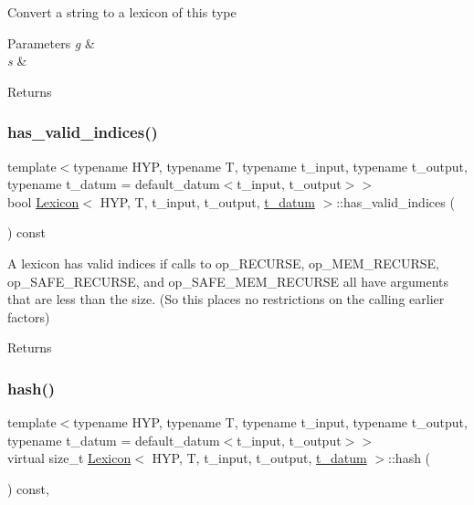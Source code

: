 Convert a string to a lexicon of this type 
\begin{DoxyParams}{Parameters}
{\em g} & \\
\hline
{\em s} & \\
\hline
\end{DoxyParams}
\begin{DoxyReturn}{Returns}

\end{DoxyReturn}
\mbox{\label{class_lexicon_a6d6b1b025ca707815a6776c3898503e4}} 
\subsubsection{\texorpdfstring{has\+\_\+valid\+\_\+indices()}{has\_valid\_indices()}}
{\footnotesize\ttfamily template$<$typename H\+YP, typename T, typename t\+\_\+input, typename t\+\_\+output, typename t\+\_\+datum = default\+\_\+datum$<$t\+\_\+input, t\+\_\+output$>$$>$ \\
bool \hyperlink{class_lexicon}{Lexicon}$<$ H\+YP, T, t\+\_\+input, t\+\_\+output, \hyperlink{class_bayesable_a7c93a2eeab708378eb321745908718d4}{t\+\_\+datum} $>$\+::has\+\_\+valid\+\_\+indices (\begin{DoxyParamCaption}{ }\end{DoxyParamCaption}) const\hspace{0.3cm}{\ttfamily [inline]}}

A lexicon has valid indices if calls to op\+\_\+\+R\+E\+C\+U\+R\+SE, op\+\_\+\+M\+E\+M\+\_\+\+R\+E\+C\+U\+R\+SE, op\+\_\+\+S\+A\+F\+E\+\_\+\+R\+E\+C\+U\+R\+SE, and op\+\_\+\+S\+A\+F\+E\+\_\+\+M\+E\+M\+\_\+\+R\+E\+C\+U\+R\+SE all have arguments that are less than the size. (So this places no restrictions on the calling earlier factors) \begin{DoxyReturn}{Returns}

\end{DoxyReturn}
\mbox{\label{class_lexicon_a4fed68bd543c0be81dfd63a2c8d219bd}} 
\subsubsection{\texorpdfstring{hash()}{hash()}}
{\footnotesize\ttfamily template$<$typename H\+YP, typename T, typename t\+\_\+input, typename t\+\_\+output, typename t\+\_\+datum = default\+\_\+datum$<$t\+\_\+input, t\+\_\+output$>$$>$ \\
virtual size\+\_\+t \hyperlink{class_lexicon}{Lexicon}$<$ H\+YP, T, t\+\_\+input, t\+\_\+output, \hyperlink{class_bayesable_a7c93a2eeab708378eb321745908718d4}{t\+\_\+datum} $>$\+::hash (\begin{DoxyParamCaption}{ }\end{DoxyParamCaption}) const\hspace{0.3cm}{\ttfamily [inline]}, {\ttfamily [virtual]}}



